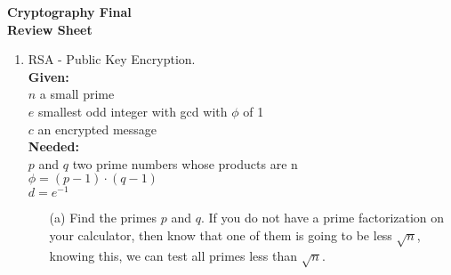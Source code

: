 \documentclass[12pt]{amsart}
\begin{document}
\thispagestyle{empty}

\begin{center}
{\bf Cryptography Final}\\
{\bf Review Sheet}\\
\end{center}
\begin{enumerate}
\item RSA - Public Key Encryption. \\
{\bf Given: }\\ $n$ a small prime\\ $e$ smallest odd integer with gcd with $\phi$ of 1\\ $c$ an encrypted message\\
{\bf Needed: }\\ $p$ and $q$ two prime numbers whose products are n\\ $\phi = (p-1) \cdot (q-1)$\\
$d = e^{-1}$\\
\begin{itemize}
\item[(a)] Find the primes $p$ and $q$.  If you do not have a prime factorization on your calculator, then know that one of them is going to be less $\sqrt{n}$, knowing this, we can test all primes less than $\sqrt{n}$.
\end{itemize}

\end{enumerate}
\end{document}
